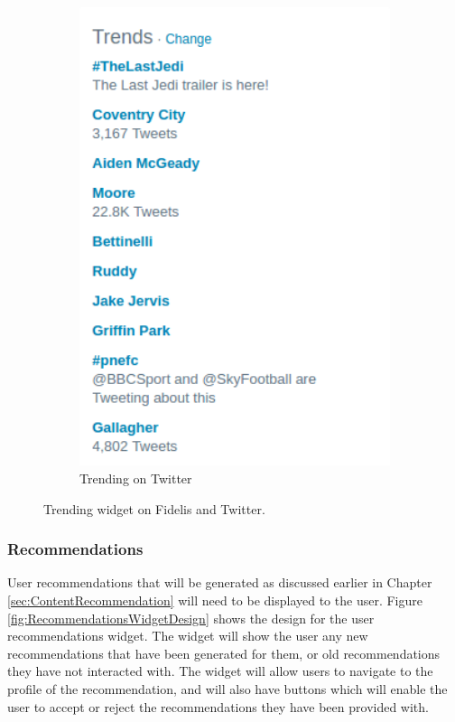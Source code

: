 \begin{figure}[H]
\begin{subfigure}[b]{0.4\linewidth}
		\includegraphics[width=1\textwidth]{Images/Design/trending-twitter}
		\caption{Trending on Twitter}
		\label{fig:trending-twitter}
	\end{subfigure}
	\caption{Trending widget on Fidelis and Twitter.}
	\label{fig:TrendingWidgets}
\end{figure}

\subsubsection{Recommendations}
User recommendations that will be generated as discussed earlier in Chapter \ref{sec:ContentRecommendation} will need to be displayed to the user. Figure \ref{fig:RecommendationsWidgetDesign} shows the design for the user recommendations widget. The widget will show the user any new recommendations that have been generated for them, or old recommendations they have not interacted with. The widget will allow users to navigate to the profile of the recommendation, and will also have buttons which will enable the user to accept or reject the recommendations they have been provided with.

